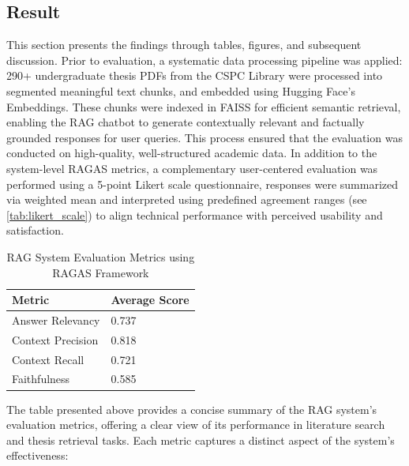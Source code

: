 \begin{refsection}
\section{Result}
This section presents the findings through tables, figures, and subsequent discussion. Prior to evaluation, a systematic data processing pipeline was applied: 290+ undergraduate thesis PDFs from the CSPC Library were processed into segmented meaningful text chunks, and embedded using Hugging Face's Embeddings. These chunks were indexed in FAISS for efficient semantic retrieval, enabling the RAG chatbot to generate contextually relevant and factually grounded responses for user queries. This process ensured that the evaluation was conducted on high-quality, well-structured academic data. In addition to the system-level RAGAS metrics, a complementary user-centered evaluation was performed using a 5-point Likert scale questionnaire, responses were summarized via weighted mean and interpreted using predefined agreement ranges (see \ref{tab:likert_scale}) to align technical performance with perceived usability and satisfaction.

\begin{table}[H]
    \centering
    \caption{RAG System Evaluation Metrics using RAGAS Framework}
    \label{tab:rag_metrics}
    \begin{tabular}{ll} 
        \hline
        \textbf{Metric}     & \textbf{Average Score} \\
        \hline
        Answer Relevancy    & 0.737 \\
        Context Precision   & 0.818 \\
        Context Recall      & 0.721 \\
        Faithfulness        & 0.585 \\
        \hline
    \end{tabular}
\end{table}

The table presented above provides a concise summary of the RAG system’s evaluation metrics, offering a clear view of its performance in literature search and thesis retrieval tasks. Each metric captures a distinct aspect of the system’s effectiveness:


\end{refsection}
